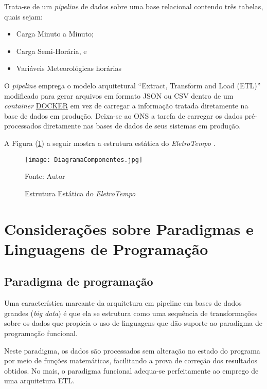 \documentclass[a4paper, 12pt]{report}
\begin{document}
\begin{doublespace}


Trata-se de um \textit{pipeline} de dados sobre uma base relacional contendo três tabelas, quais sejam: 
\begin{itemize}
    \item Carga Minuto a Minuto;
    \item Carga Semi-Horária, e
    \item Variáveis Meteorológicas horárias
\end{itemize}

O \textit{pipeline} emprega o modelo arquitetural ``Extract, Transform and Load (ETL)'' modificado para gerar arquivos em formato JSON ou CSV dentro de um \textit{container} \href{https://www.docker.com/}{DOCKER} em vez de carregar a informação tratada diretamente na base de dados em produção. Deixa-se ao ONS a tarefa de carregar os dados pré-processados diretamente nas bases de dados de seus sistemas em produção.

A Figura (\ref{VisaoEstatica}) a seguir mostra a estrutura estática do \textit{EletroTempo} \textsuperscript{\textregistered}.


\begin{figure}[H]
	\caption{\label{VisaoEstatica} Estrutura Estática do \textit{EletroTempo} \textsuperscript{\textregistered}}
	\begin{center}
		\texttt{[image: DiagramaComponentes.jpg]}
		
		Fonte: Autor
	\end{center}
	
\end{figure}

\section{Considerações sobre Paradigmas e Linguagens de Programação}
\subsection{Paradigma de programação}
Uma característica marcante da arquitetura em pipeline em bases de dados grandes (\textit{big data}) é que ela se estrutura como uma sequência de transformações sobre os dados que propicia o uso de linguagens que dão suporte ao paradigma de programação funcional.

Neste paradigma, os dados são processados sem alteração no estado do programa por meio de funções matemáticas, facilitando a prova de correção dos resultados obtidos.  No mais, o paradigma funcional adequa-se perfeitamente ao emprego de uma arquitetura ETL.


\end{doublespace}
\end{document}
